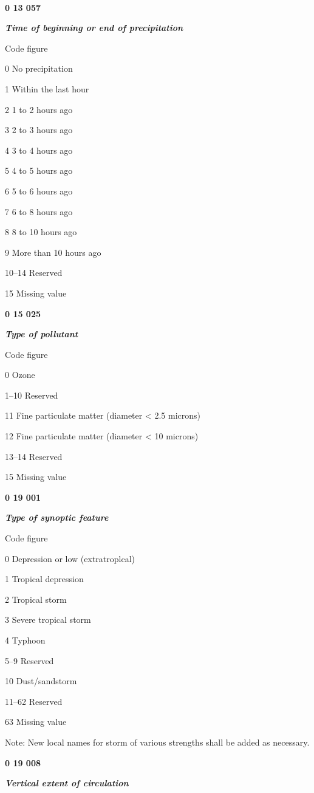 \textbf{\\
}

\textbf{0 13 057}

\emph{\textbf{Time of beginning or end of precipitation}}

Code figure

0 No precipitation

1 Within the last hour

2 1 to 2 hours ago

3 2 to 3 hours ago

4 3 to 4 hours ago

5 4 to 5 hours ago

6 5 to 6 hours ago

7 6 to 8 hours ago

8 8 to 10 hours ago

9 More than 10 hours ago

10--14 Reserved

15 Missing value

\textbf{0 15 025}

\emph{\textbf{Type of pollutant}}

Code figure

0 Ozone

1--10 Reserved

11 Fine particulate matter (diameter \textless{} 2.5 microns)

12 Fine particulate matter (diameter \textless{} 10 microns)

13--14 Reserved

15 Missing value

\textbf{0 19 001}

\emph{\textbf{Type of synoptic feature}}

Code figure

0 Depression or low (extratroplcal)

1 Tropical depression

2 Tropical storm

3 Severe tropical storm

4 Typhoon

5--9 Reserved

10 Dust/sandstorm

11--62 Reserved

63 Missing value

Note: New local names for storm of various strengths shall be added as necessary.

\textbf{0 19 008}

\emph{\textbf{Vertical extent of circulation}}

